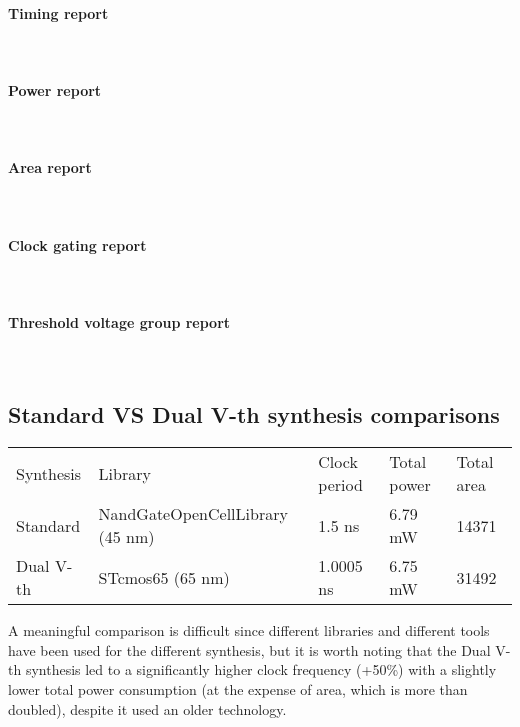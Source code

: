 \paragraph{Timing report} \mbox{} \\

\paragraph{Power report} \mbox{} \\

\paragraph{Area report} \mbox{} \\

\paragraph{Clock gating report} \mbox{} \\

\paragraph{Threshold voltage group report} \mbox{} \\


\subsection{Standard VS Dual V-th synthesis comparisons}
\begin{table}[H]
	\centering
	\begin{tabular}{lllll}
		\hline
		\rowcolor{gray!50}
		Synthesis & Library & Clock period & Total power & Total area \\
		Standard & NandGateOpenCellLibrary (45 nm) & 1.5 ns & 6.79 mW & 14371 \\
		\rowcolor{gray!25}
		Dual V-th & STcmos65 (65 nm) & 1.0005 ns & 6.75 mW & 31492 \\
		\hline
	\end{tabular}
	\label{tab:syn_cmp}
\end{table}

A meaningful comparison is difficult since different libraries and different
tools have been used for the different synthesis, but it is worth noting that
the Dual V-th synthesis led to a significantly higher clock frequency (+50\%)
with a slightly lower total power consumption (at the expense of area, which is
more than doubled), despite it used an older technology.

